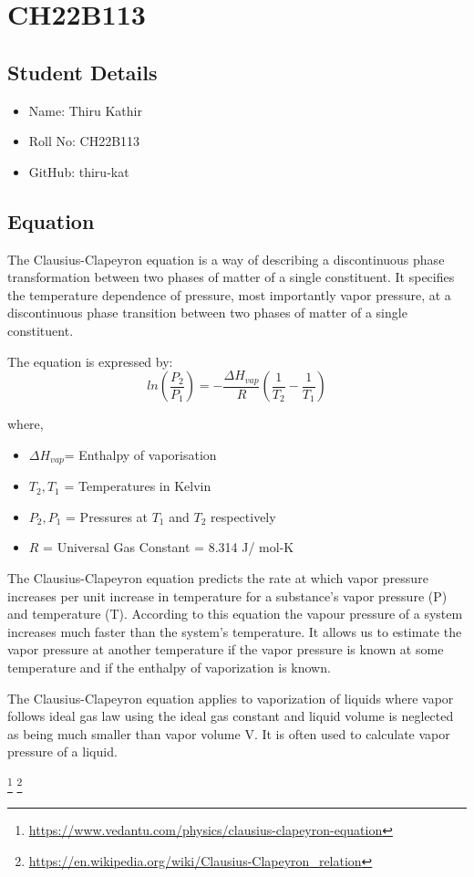 \documentclass{article}
\begin{document}
\section{CH22B113}


\subsection{Student Details}

\begin{itemize}
  \item Name: Thiru Kathir
  \item Roll No: CH22B113
  \item GitHub: thiru-kat
\end{itemize}

\subsection{Equation}


The Clausius-Clapeyron equation is a way of describing a discontinuous phase transformation between two phases of matter of a single constituent. It specifies the temperature dependence of pressure, most importantly vapor pressure, at a discontinuous phase transition between two phases of matter of a single constituent. 

\vspace{8mm}
The equation is expressed by:
\begin{equation}
   ln(\frac{P_2}{P_1})=- \frac{\Delta H_{vap}}{R}(\frac{1}{T_2}-\frac{1}{T_1})
\end{equation}

where,
\begin{itemize}
    \item $\Delta H_{vap}$= Enthalpy of vaporisation
    \item $T_2,T_1$ = Temperatures in Kelvin 
    \item $P_2,P_1$ = Pressures at $T_1$ and $T_2$ respectively
    \item $R$ = Universal Gas Constant = 8.314 J/ mol-K
\end{itemize}




The Clausius-Clapeyron equation predicts the rate at which vapor pressure increases per unit increase in temperature for a substance’s vapor pressure (P) and temperature (T). According to this equation the vapour pressure of a system increases much faster than the system's temperature. It allows us to estimate the vapor pressure at another temperature if the vapor pressure is known at some temperature and if the enthalpy of vaporization is known.

The Clausius-Clapeyron equation applies to vaporization of liquids where vapor follows ideal gas law using the ideal gas constant and liquid volume is neglected as being much smaller than vapor volume V. It is often used to calculate vapor pressure of a liquid.


\footnote{\url{https://www.vedantu.com/physics/clausius-clapeyron-equation}}
\footnote{\url{https://en.wikipedia.org/wiki/Clausius-Clapeyron_relation}}
\end{document}
